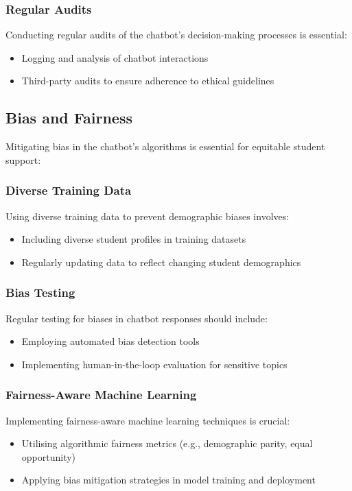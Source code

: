 \documentclass[15pt,a4paper]{article}
\begin{document}
\begin{multicols}{2}
\subsubsection*{Regular Audits}
Conducting regular audits of the chatbot's decision-making processes \textit{\parencite{AIEthicsGuidelines2024}} is essential:
\begin{itemize}
    \item Logging and analysis of chatbot interactions
    \item Third-party audits to ensure adherence to ethical guidelines
\end{itemize}

\subsection{Bias and Fairness}
Mitigating bias in the chatbot's algorithms is essential for equitable student support:

\subsubsection*{Diverse Training Data}
Using diverse training data to prevent demographic biases \textit{\parencite[pp. 1-35]{Mehrabi2023}} involves:
\begin{itemize}
    \item Including diverse student profiles in training datasets
    \item Regularly updating data to reflect changing student demographics
\end{itemize}

\subsubsection*{Bias Testing}
Regular testing for biases in chatbot responses \textit{\parencite{ACMFAccT2024}} should include:
\begin{itemize}
    \item Employing automated bias detection tools
    \item Implementing human-in-the-loop evaluation for sensitive topics
\end{itemize}

\subsubsection*{Fairness-Aware Machine Learning}
Implementing fairness-aware machine learning techniques \textit{\parencite{Barocas2021}} is crucial:
\begin{itemize}
    \item Utilising algorithmic fairness metrics (e.g., demographic parity, equal opportunity)
    \item Applying bias mitigation strategies in model training and deployment
\end{itemize}


\end{multicols}
\end{document}
